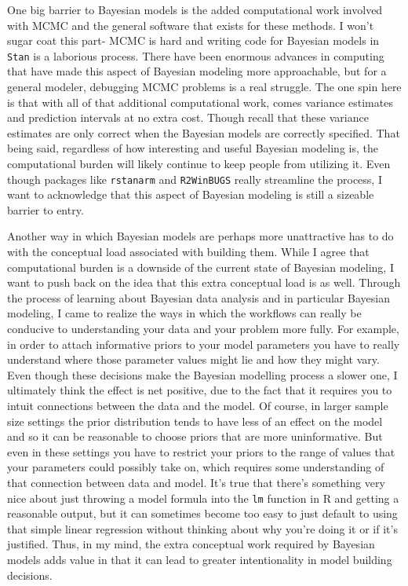 \documentclass[12pt,twoside]{reedthesis}
\begin{document}
One big barrier to Bayesian models is the added computational work involved with MCMC and the general software that exists for these methods. I won't sugar coat this part- MCMC is hard and writing code for Bayesian models in \texttt{Stan} is a laborious process. There have been enormous advances in computing that have made this aspect of Bayesian modeling more approachable, but for a general modeler, debugging MCMC problems is a real struggle. The one spin here is that with all of that additional computational work, comes variance estimates and prediction intervals at no extra cost. Though recall that these variance estimates are only correct when the Bayesian models are correctly specified. That being said, regardless of how interesting and useful Bayesian modeling is, the computational burden will likely continue to keep people from utilizing it. Even though packages like \texttt{rstanarm} and \texttt{R2WinBUGS} really streamline the process, I want to acknowledge that this aspect of Bayesian modeling is still a sizeable barrier to entry.

Another way in which Bayesian models are perhaps more unattractive has to do with the conceptual load associated with building them. While I agree that computational burden is a downside of the current state of Bayesian modeling, I want to push back on the idea that this extra conceptual load is as well. Through the process of learning about Bayesian data analysis and in particular Bayesian modeling, I came to realize the ways in which the workflows can really be conducive to understanding your data and your problem more fully. For example, in order to attach informative priors to your model parameters you have to really understand where those parameter values might lie and how they might vary. Even though these decisions make the Bayesian modelling process a slower one, I ultimately think the effect is net positive, due to the fact that it requires you to intuit connections between the data and the model. Of course, in larger sample size settings the prior distribution tends to have less of an effect on the model and so it can be reasonable to choose priors that are more uninformative. But even in these settings you have to restrict your priors to the range of values that your parameters could possibly take on, which requires some understanding of that connection between data and model. It's true that there's something very nice about just throwing a model formula into the \texttt{lm} function in R and getting a reasonable output, but it can sometimes become too easy to just default to using that simple linear regression without thinking about why you're doing it or if it's justified. Thus, in my mind, the extra conceptual work required by Bayesian models adds value in that it can lead to greater intentionality in model building decisions.
\end{document}
